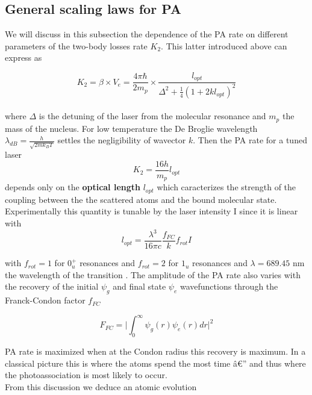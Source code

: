 \subsection{General scaling laws for PA}
We will discuss in this subsection the dependence of the PA rate on different parameters 
of the two-body losses rate $K_2$. This latter introduced above can express as \cite{blatt_systematic_2011}


\begin{equation}
    K_2 = \beta \times V_e = \frac{4\pi \hbar}{2m_p}\times \frac{l_{opt}}{\Delta^2 +\frac{1}{4}(1+2k l_{opt})^2}
\end{equation}\\

where $\Delta$ is the detuning of the laser from the molecular resonance and $m_p$ the mass of the nucleus.
For low temperature the De Broglie wavelength $\lambda_{dB} = \frac{h}{\sqrt{2m k_B T}}$ settles the negligibility of wavector $k$. Then the PA rate for
a tuned laser  
\begin{equation}
    K_2 = \frac{16h }{m_p}l_{opt}
\end{equation}
depends only on the \textbf{optical length} $l_{opt}$ which caracterizes the strength of the coupling between the
the scattered atoms and the bound molecular state. Experimentally this quantity is tunable by the laser intensity I
since it is linear with 
\begin{equation}
    l_{opt} = \frac{\lambda^3}{16\pi c}\frac{f_{FC}}{k}f_{rot}I
\end{equation}

with $f_{rot} = 1$ for $0_u^+$ resonances and $f_{rot} = 2$ for $1_u$ resonances and $\lambda=689.45$ nm the wavelength 
of the transition \cite{reschovsky_narrow-line_2018}. The amplitude of the PA rate also varies with the recovery of the 
initial $\psi_g$ and final state $\psi_e$ wavefunctions through the Franck-Condon factor $f_{FC}$ 

\begin{equation} 
    F_{FC} = \Bigg|\int_0^{\infty} \psi_g(r) \psi_e(r) dr\Bigg |^2 
\end{equation}

PA rate is maximized when at the Condon radius this recovery is maximum. In a classical picture this is where 
the atoms spend the most time â€” and thus where the photoassociation is most 
likely to occur.\\

From this discussion we deduce an atomic evolution 

